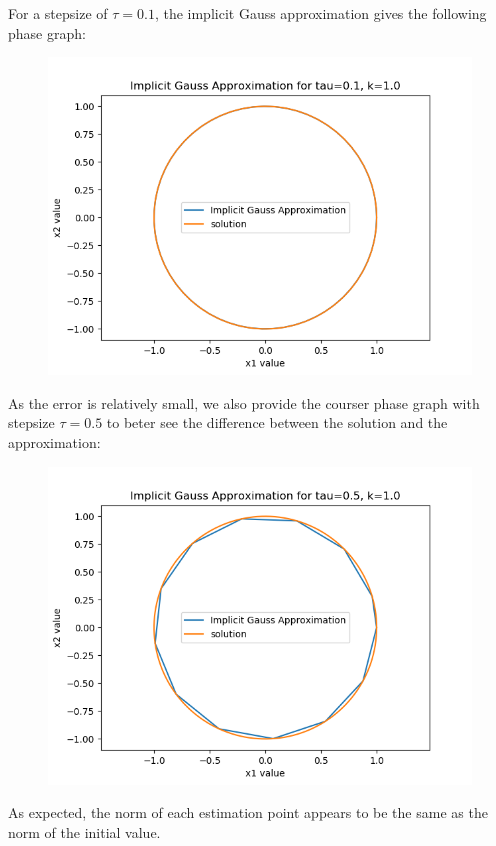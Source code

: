 \documentclass{article}
\theoremstyle{definition}
\begin{document}
\begin{itemize}
		For a stepsize of $\tau=0.1$,
		the implicit Gauss approximation gives the following
		phase graph:
		\begin{figure}[H]
			\includegraphics[scale=0.6]{harmonic_phase_gaus_01}
		\end{figure}
		As the error is relatively small, we also provide the
		courser phase graph with stepsize $\tau=0.5$ to beter see the
		difference between the solution and the approximation:
		\begin{figure}[H]
			\includegraphics[scale=0.6]{harmonic_phase_gaus_05}
		\end{figure}
		As expected, the norm of each estimation point appears to be the
		same as the norm of the initial value.


\end{itemize}
\end{document}
